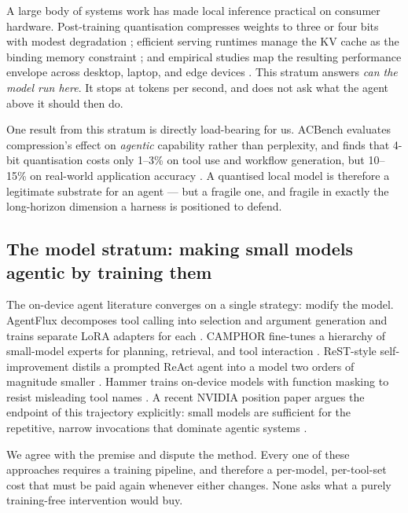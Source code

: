 \documentclass[11pt,a4paper]{article}
\begin{document}
A large body of systems work has made local inference practical on consumer
hardware. Post-training quantisation compresses weights to three or four bits
with modest degradation \citep{frantar2023gptq,lin2024awq}; efficient serving
runtimes manage the KV cache as the binding memory constraint
\citep{kwon2023pagedattention}; and empirical studies map the resulting
performance envelope across desktop, laptop, and edge devices
\citep{huang2025edge,martinez2025latency,xu2024ondevice}. This stratum answers
\emph{can the model run here}. It stops at tokens per second, and does not ask
what the agent above it should then do.

One result from this stratum is directly load-bearing for us. ACBench evaluates
compression's effect on \emph{agentic} capability rather than perplexity, and
finds that 4-bit quantisation costs only 1--3\% on tool use and workflow
generation, but 10--15\% on real-world application accuracy
\citep{dong2025acbench}. A quantised local model is therefore a legitimate
substrate for an agent --- but a fragile one, and fragile in exactly the
long-horizon dimension a harness is positioned to defend.

\subsection{The model stratum: making small models agentic by training them}

The on-device agent literature converges on a single strategy: modify the model.
AgentFlux decomposes tool calling into selection and argument generation and
trains separate LoRA adapters for each \citep{kadekodi2025agentflux}. CAMPHOR
fine-tunes a hierarchy of small-model experts for planning, retrieval, and tool
interaction \citep{fu2025camphor}. ReST-style self-improvement distils a
prompted ReAct agent into a model two orders of magnitude smaller
\citep{aksitov2023rest}. Hammer trains on-device models with function masking to
resist misleading tool names \citep{lin2025robust}. A recent NVIDIA position
paper argues the endpoint of this
trajectory explicitly: small models are sufficient for the repetitive, narrow
invocations that dominate agentic systems \citep{belcak2025slm}.

We agree with the premise and dispute the method. Every one of these approaches
requires a training pipeline, and therefore a per-model, per-tool-set cost that
must be paid again whenever either changes. None asks what a purely training-free
intervention would buy.
\end{document}
